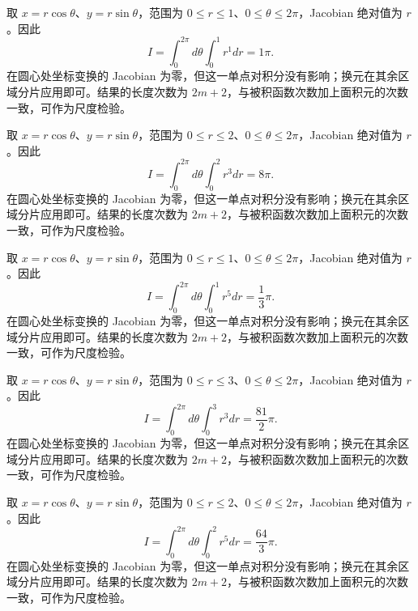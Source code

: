 \documentclass[12pt,fontset=fandol]{ctexart}
\begin{document}
\begin{solve}\label{ans:c36q14}
取 $x=r\cos\theta$、$y=r\sin\theta$，范围为 $0\le r\le 1$、$0\le\theta\le2\pi$，Jacobian 绝对值为 $r$。因此
\[
I=\int_0^{2\pi}d\theta\int_0^{1}r^{1}dr=1\pi.
\]
在圆心处坐标变换的 Jacobian 为零，但这一单点对积分没有影响；换元在其余区域分片应用即可。结果的长度次数为 $2m+2$，与被积函数次数加上面积元的次数一致，可作为尺度检验。
\end{solve}

\begin{solve}\label{ans:c36q15}
取 $x=r\cos\theta$、$y=r\sin\theta$，范围为 $0\le r\le 2$、$0\le\theta\le2\pi$，Jacobian 绝对值为 $r$。因此
\[
I=\int_0^{2\pi}d\theta\int_0^{2}r^{3}dr=8\pi.
\]
在圆心处坐标变换的 Jacobian 为零，但这一单点对积分没有影响；换元在其余区域分片应用即可。结果的长度次数为 $2m+2$，与被积函数次数加上面积元的次数一致，可作为尺度检验。
\end{solve}

\begin{solve}\label{ans:c36q16}
取 $x=r\cos\theta$、$y=r\sin\theta$，范围为 $0\le r\le 1$、$0\le\theta\le2\pi$，Jacobian 绝对值为 $r$。因此
\[
I=\int_0^{2\pi}d\theta\int_0^{1}r^{5}dr=\frac{1}{3}\pi.
\]
在圆心处坐标变换的 Jacobian 为零，但这一单点对积分没有影响；换元在其余区域分片应用即可。结果的长度次数为 $2m+2$，与被积函数次数加上面积元的次数一致，可作为尺度检验。
\end{solve}

\begin{solve}\label{ans:c36q17}
取 $x=r\cos\theta$、$y=r\sin\theta$，范围为 $0\le r\le 3$、$0\le\theta\le2\pi$，Jacobian 绝对值为 $r$。因此
\[
I=\int_0^{2\pi}d\theta\int_0^{3}r^{3}dr=\frac{81}{2}\pi.
\]
在圆心处坐标变换的 Jacobian 为零，但这一单点对积分没有影响；换元在其余区域分片应用即可。结果的长度次数为 $2m+2$，与被积函数次数加上面积元的次数一致，可作为尺度检验。
\end{solve}

\begin{solve}\label{ans:c36q18}
取 $x=r\cos\theta$、$y=r\sin\theta$，范围为 $0\le r\le 2$、$0\le\theta\le2\pi$，Jacobian 绝对值为 $r$。因此
\[
I=\int_0^{2\pi}d\theta\int_0^{2}r^{5}dr=\frac{64}{3}\pi.
\]
在圆心处坐标变换的 Jacobian 为零，但这一单点对积分没有影响；换元在其余区域分片应用即可。结果的长度次数为 $2m+2$，与被积函数次数加上面积元的次数一致，可作为尺度检验。
\end{solve}
\end{document}
